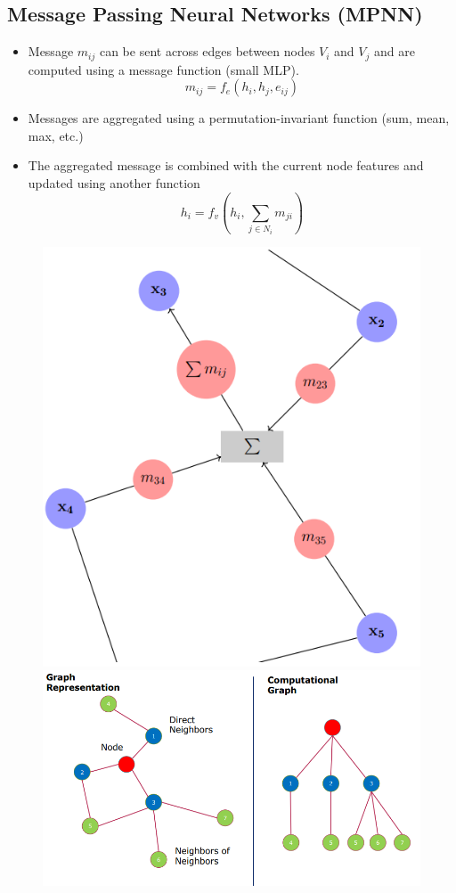 \subsection{Message Passing Neural Networks (MPNN)}
\begin{itemize}
    \item Message \(m_{ij}\) can be sent across edges between nodes \(V_i\) and \(V_j\) and are computed using a message function (small MLP).
    \[
    m_{ij} = f_e(h_i,h_j,e_{ij})
    \]
    \item Messages are aggregated using a permutation-invariant function (sum, mean, max, etc.)
    \item The aggregated message is combined with the current node features and updated using another function
    \[
    h_i = f_v(h_i,\sum_{j \in N_i}m_{ji})
    \]
\end{itemize}
\begin{figure}[!h]
    \centering
    \includegraphics[width = 0.3\columnwidth]{figures/GraphNeuralNetworks2/MessagePassing1.png}
    \includegraphics[width = 0.65\columnwidth]{figures/GraphNeuralNetworks2/MessagePassing2.png}
\end{figure}

